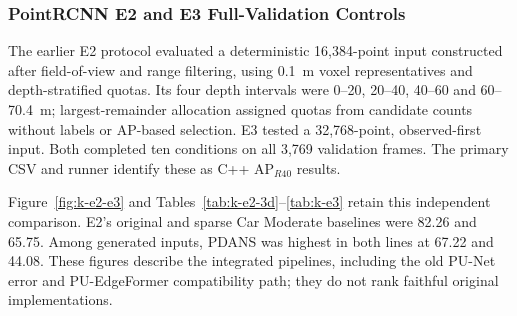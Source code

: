 \subsubsection{PointRCNN E2 and E3 Full-Validation Controls}
\label{sec:k-e2-e3}

The earlier E2 protocol evaluated a deterministic 16,384-point input
constructed after field-of-view and range filtering, using 0.1~m voxel
representatives and depth-stratified quotas. Its four depth intervals
were 0--20, 20--40, 40--60 and 60--70.4~m; largest-remainder allocation
assigned quotas from candidate counts without labels or AP-based
selection. E3 tested a 32,768-point, observed-first input. Both completed
ten conditions on all 3,769 validation frames. The primary CSV and
runner identify these as C++ AP$_{R40}$ results.

Figure~\ref{fig:k-e2-e3} and Tables~\ref{tab:k-e2-3d}--\ref{tab:k-e3}
retain this independent comparison. E2's original and sparse Car
Moderate baselines were 82.26 and 65.75. Among generated inputs, PDANS
was highest in both lines at 67.22 and 44.08. These figures describe
the integrated pipelines, including the old PU-Net error and
PU-EdgeFormer compatibility path; they do not rank faithful original
implementations.


